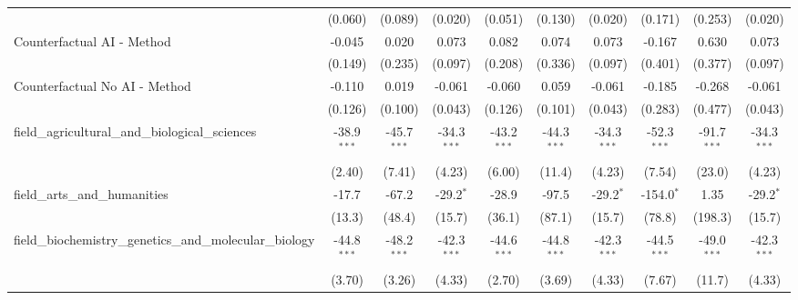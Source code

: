 \begin{tabular}{lccccccccc}
                                                               & (0.060)        & (0.089)        & (0.020)       & (0.051)        & (0.130)        & (0.020)       & (0.171)        & (0.253)        & (0.020)\\   
   Counterfactual AI - Method                                  & -0.045         & 0.020          & 0.073         & 0.082          & 0.074          & 0.073         & -0.167         & 0.630          & 0.073\\   
                                                               & (0.149)        & (0.235)        & (0.097)       & (0.208)        & (0.336)        & (0.097)       & (0.401)        & (0.377)        & (0.097)\\   
   Counterfactual No AI - Method                               & -0.110         & 0.019          & -0.061        & -0.060         & 0.059          & -0.061        & -0.185         & -0.268         & -0.061\\   
                                                               & (0.126)        & (0.100)        & (0.043)       & (0.126)        & (0.101)        & (0.043)       & (0.283)        & (0.477)        & (0.043)\\   
   field\_agricultural\_and\_biological\_sciences              & -38.9$^{***}$  & -45.7$^{***}$  & -34.3$^{***}$ & -43.2$^{***}$  & -44.3$^{***}$  & -34.3$^{***}$ & -52.3$^{***}$  & -91.7$^{***}$  & -34.3$^{***}$\\   
                                                               & (2.40)         & (7.41)         & (4.23)        & (6.00)         & (11.4)         & (4.23)        & (7.54)         & (23.0)         & (4.23)\\   
   field\_arts\_and\_humanities                                & -17.7          & -67.2          & -29.2$^{*}$   & -28.9          & -97.5          & -29.2$^{*}$   & -154.0$^{*}$   & 1.35           & -29.2$^{*}$\\   
                                                               & (13.3)         & (48.4)         & (15.7)        & (36.1)         & (87.1)         & (15.7)        & (78.8)         & (198.3)        & (15.7)\\   
   field\_biochemistry\_genetics\_and\_molecular\_biology      & -44.8$^{***}$  & -48.2$^{***}$  & -42.3$^{***}$ & -44.6$^{***}$  & -44.8$^{***}$  & -42.3$^{***}$ & -44.5$^{***}$  & -49.0$^{***}$  & -42.3$^{***}$\\   
                                                               & (3.70)         & (3.26)         & (4.33)        & (2.70)         & (3.69)         & (4.33)        & (7.67)         & (11.7)         & (4.33)\\   

\end{tabular}
